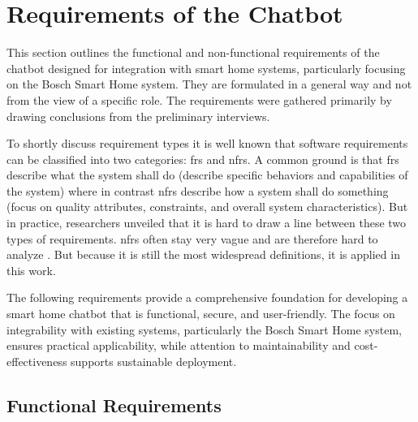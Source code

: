 \section{Requirements of the Chatbot}

This section outlines the functional and non-functional requirements of the chatbot designed for integration with smart home systems, particularly focusing on the Bosch Smart Home system.
They are formulated in a general way and not from the view of a specific role.
The requirements were gathered primarily by drawing conclusions from the preliminary interviews.

To shortly discuss requirement types it is well known that  software requirements can be classified into two categories: \glspl{fr} and \glspl{nfr}. 
A common ground is that \glspl{fr} describe what the system shall do (describe specific behaviors and capabilities of the system) where in contrast \glspl{nfr} describe how a system shall do something (focus on quality attributes, constraints, and overall system characteristics).
But in practice, researchers unveiled that it is hard to draw a line between these two types of requirements. \glspl{nfr} often stay very vague and are therefore hard to analyze \cite{nfr_fr}.
But because it is still the most widespread definitions, it is applied in this work.

The following requirements provide a comprehensive foundation for developing a smart home chatbot that is functional, secure, and user-friendly. The focus on integrability with existing systems, particularly the Bosch Smart Home system, ensures practical applicability, while attention to maintainability and cost-effectiveness supports sustainable deployment.

\subsection{Functional Requirements}

